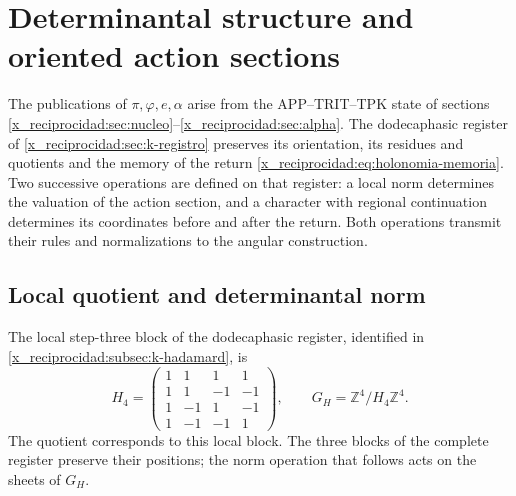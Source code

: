 \section{Determinantal structure and oriented action sections}
\label{x_reciprocidad:iv:action:section}

The publications of \(\pi,\varphi,e,\alpha\) arise from the
APP--TRIT--TPK state of sections
\ref{x_reciprocidad:sec:nucleo}--\ref{x_reciprocidad:sec:alpha}. The dodecaphasic register of
\ref{x_reciprocidad:sec:k-registro} preserves its orientation, its residues and
quotients and the memory of the return
\eqref{x_reciprocidad:eq:holonomia-memoria}. Two successive operations are defined on that
register: a local norm determines the valuation of the action
section, and a character with regional continuation determines its
coordinates before and after the return. Both operations
transmit their rules and normalizations to the angular construction.

\subsection{Local quotient and determinantal norm}
\label{x_reciprocidad:iv:action:determinantal}

The local step-three block of the dodecaphasic register, identified
in \ref{x_reciprocidad:subsec:k-hadamard}, is
\begin{equation}
 H_4=\begin{pmatrix}
 1&1&1&1\\
 1&1&-1&-1\\
 1&-1&1&-1\\
 1&-1&-1&1
 \end{pmatrix},
 \qquad G_H=\mathbb Z^4/H_4\mathbb Z^4.
 \label{x_reciprocidad:iv:action:h4}
\end{equation}
The quotient corresponds to this local block. The three blocks of the
complete register preserve their positions; the norm operation
that follows acts on the sheets of \(G_H\).


